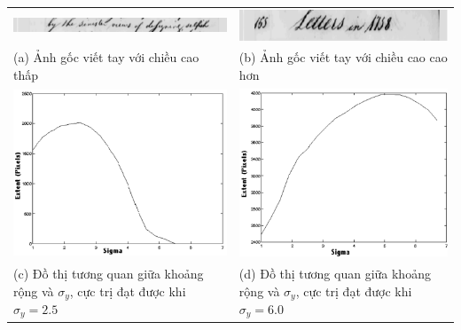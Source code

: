 \documentclass[12pt, a4paper]{article}
\begin{document}
\begin{table}
\centering
\begin{tabular}{LL}
\includegraphics[scale=0.52]{imgs/a_line_img_smaller_height.png} & \includegraphics[scale=0.52]{imgs/a_line_img_larger_height.png} \\
(a) Ảnh gốc viết tay với chiều cao thấp & (b) Ảnh gốc viết tay với chiều cao cao hơn \\
\includegraphics[scale=0.52]{imgs/ploty25n4.png} & \includegraphics[scale=0.52]{imgs/ploty6n4.png}\\
(c) Đồ thị tương quan giữa khoảng rộng và $\sigma_y$, cực trị đạt được khi $\sigma_y = 2.5$ & (d) Đồ thị tương quan giữa khoảng rộng và $\sigma_y$, cực trị đạt được khi $\sigma_y = 6.0$
\end{tabular}
\label{tab:gt}
\end{table}
\end{document}
